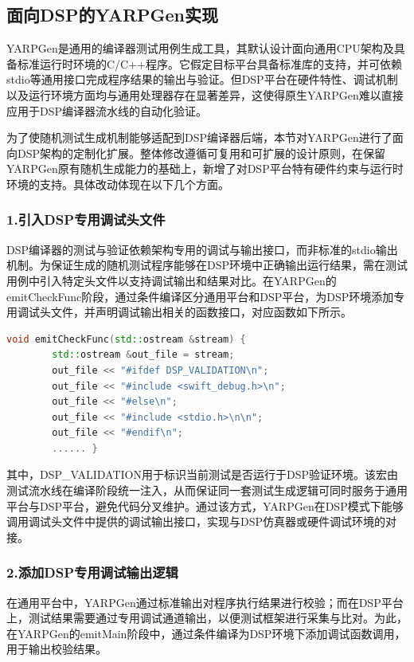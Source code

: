 \subsection{面向DSP的YARPGen实现}
YARPGen是通用的编译器测试用例生成工具，其默认设计面向通用CPU架构及具备标准运行时环境的C/C++程序。它假定目标平台具备标准库的支持，并可依赖stdio等通用接口完成程序结果的输出与验证。但DSP平台在硬件特性、调试机制以及运行环境方面均与通用处理器存在显著差异，这使得原生YARPGen难以直接应用于DSP编译器流水线的自动化验证。

\par

为了使随机测试生成机制能够适配到DSP编译器后端，本节对YARPGen进行了面向DSP架构的定制化扩展。整体修改遵循可复用和可扩展的设计原则，在保留YARPGen原有随机生成能力的基础上，新增了对DSP平台特有硬件约束与运行时环境的支持。具体改动体现在以下几个方面。


\subsubsection{1.引入DSP专用调试头文件}
DSP编译器的测试与验证依赖架构专用的调试与输出接口，而非标准的stdio输出机制。为保证生成的随机测试程序能够在DSP环境中正确输出运行结果，需在测试用例中引入特定头文件以支持调试输出和结果对比。在YARPGen的emitCheckFunc阶段，通过条件编译区分通用平台和DSP平台，为DSP环境添加专用调试头文件，并声明调试输出相关的函数接口，对应函数如下所示。

\lstset{language=c++}
\begin{lstlisting}[language=C++]
	void emitCheckFunc(std::ostream &stream) {
		std::ostream &out_file = stream;
		out_file << "#ifdef DSP_VALIDATION\n";
		out_file << "#include <swift_debug.h>\n";
		out_file << "#else\n";
		out_file << "#include <stdio.h>\n\n";
		out_file << "#endif\n";
		...... }
\end{lstlisting}

其中，DSP\_VALIDATION用于标识当前测试是否运行于DSP验证环境。该宏由测试流水线在编译阶段统一注入，从而保证同一套测试生成逻辑可同时服务于通用平台与DSP平台，避免代码分叉维护。通过该方式，YARPGen在DSP模式下能够调用调试头文件中提供的调试输出接口，实现与DSP仿真器或硬件调试环境的对接。


\subsubsection{2.添加DSP专用调试输出逻辑}
在通用平台中，YARPGen通过标准输出对程序执行结果进行校验；而在DSP平台上，测试结果需要通过专用调试通道输出，以便测试框架进行采集与比对。为此，在YARPGen的emitMain阶段中，通过条件编译为DSP环境下添加调试函数调用，用于输出校验结果。


